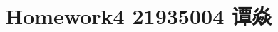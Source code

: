 \documentclass[a4paper]{book}
\makeatletter
\newcommand{\voidenvironment}[1]{%
  \expandafter\providecommand\csname env@#1@save@env\endcsname{}%
  \expandafter\providecommand\csname env@#1@process\endcsname{}%
  \@ifundefined{#1}{}{\RenewEnviron{#1}{}}%
}
\numberwithin{equation}{chapter}
\theoremstyle{definition}
\makeatother
\begin{document}
\pagestyle{empty}
%



\setcounter{chapter}{3}




\chapter{Homework4 21935004 谭焱}
\end{document}
